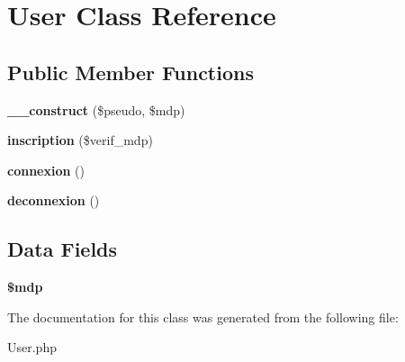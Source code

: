 \hypertarget{class_user}{}\section{User Class Reference}
\label{class_user}
\subsection*{Public Member Functions}
\begin{DoxyCompactItemize}
\item 
\mbox{\label{class_user_ac60cdf778bb368629105b8ce6d23b512}} 
{\bfseries \+\_\+\+\_\+construct} (\$pseudo, \$mdp)
\item 
\mbox{\label{class_user_af10edcf6810fc3a4232bc4a309530db2}} 
{\bfseries inscription} (\$verif\+\_\+mdp)
\item 
\mbox{\label{class_user_a72636d5958b9e74f0bf44d4f8088036e}} 
{\bfseries connexion} ()
\item 
\mbox{\label{class_user_a999ec8c14031968ce9d6ba2410105d4b}} 
{\bfseries deconnexion} ()
\end{DoxyCompactItemize}
\subsection*{Data Fields}
\begin{DoxyCompactItemize}
\item 
\mbox{\label{class_user_a8a65334de2f0d486a42b02ecf82fe8fb}} 
{\bfseries \$mdp}
\end{DoxyCompactItemize}


The documentation for this class was generated from the following file\+:\begin{DoxyCompactItemize}
\item 
User.\+php\end{DoxyCompactItemize}
